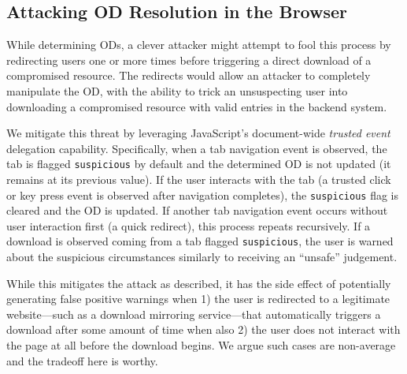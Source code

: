 \subsection{Attacking OD Resolution in the Browser}

While determining ODs, a clever attacker might attempt to fool this process by
redirecting users one or more times before triggering a direct download of a
compromised resource. The redirects would allow an attacker to completely
manipulate the OD, with the ability to trick an unsuspecting user into
downloading a compromised resource with valid entries in the backend system.

We mitigate this threat by leveraging JavaScript's document-wide \emph{trusted
event}~\cite{TrustedEvents} delegation capability. Specifically, when a tab
navigation event is observed, the tab is flagged \texttt{suspicious} by default
and the determined OD is not updated (\ie it remains at its previous value). If
the user interacts with the tab (\ie a trusted click or key press event is
observed after navigation completes), the \texttt{suspicious} flag is cleared
and the OD is updated. If another tab navigation event occurs without user
interaction first (\eg a quick redirect), this process repeats recursively. If a
download is observed coming from a tab flagged \texttt{suspicious}, the user is
warned about the suspicious circumstances similarly to receiving an ``unsafe''
judgement.

While this mitigates the attack as described, it has the side effect of
potentially generating false positive warnings when 1) the user is redirected to
a legitimate website---such as a download mirroring service---that automatically
triggers a download after some amount of time when also 2) the user does not
interact with the page at all before the download begins. We argue such cases
are non-average and the tradeoff here is worthy.
